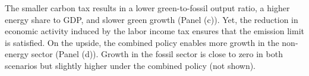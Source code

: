 The smaller carbon tax results in a lower green-to-fossil output ratio, a higher energy share to GDP, and slower green growth (Panel (c)). Yet, the reduction in economic activity induced by the labor income tax ensures that the emission limit is satisfied. On the upside, the combined policy enables more growth in the non-energy sector (Panel (d)). Growth in the fossil sector is close to zero in both scenarios but slightly higher under the combined policy (not shown).  %
